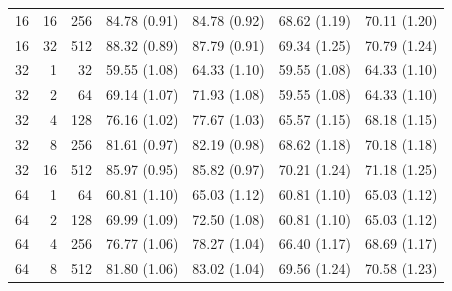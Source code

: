 \documentclass[11pt,letterpaper]{article}
\begin{document}
\begin{table}[p]
\begin{tabular}{@{}rrr rrrr@{}}
16 & 16 & 256 & 84.78 {\scriptsize (0.91)} & 84.78 {\scriptsize (0.92)} & 68.62 {\scriptsize (1.19)} & 70.11 {\scriptsize (1.20)} \\
16 & 32 & 512 & 88.32 {\scriptsize (0.89)} & 87.79 {\scriptsize (0.91)} & 69.34 {\scriptsize (1.25)} & 70.79 {\scriptsize (1.24)} \\
\midrule
32 & 1 & 32 & 59.55 {\scriptsize (1.08)} & 64.33 {\scriptsize (1.10)} & 59.55 {\scriptsize (1.08)} & 64.33 {\scriptsize (1.10)} \\
32 & 2 & 64 & 69.14 {\scriptsize (1.07)} & 71.93 {\scriptsize (1.08)} & 59.55 {\scriptsize (1.08)} & 64.33 {\scriptsize (1.10)} \\
32 & 4 & 128 & 76.16 {\scriptsize (1.02)} & 77.67 {\scriptsize (1.03)} & 65.57 {\scriptsize (1.15)} & 68.18 {\scriptsize (1.15)} \\
32 & 8 & 256 & 81.61 {\scriptsize (0.97)} & 82.19 {\scriptsize (0.98)} & 68.62 {\scriptsize (1.18)} & 70.18 {\scriptsize (1.18)} \\
32 & 16 & 512 & 85.97 {\scriptsize (0.95)} & 85.82 {\scriptsize (0.97)} & 70.21 {\scriptsize (1.24)} & 71.18 {\scriptsize (1.25)} \\
\midrule
64 & 1 & 64 & 60.81 {\scriptsize (1.10)} & 65.03 {\scriptsize (1.12)} & 60.81 {\scriptsize (1.10)} & 65.03 {\scriptsize (1.12)} \\
64 & 2 & 128 & 69.99 {\scriptsize (1.09)} & 72.50 {\scriptsize (1.08)} & 60.81 {\scriptsize (1.10)} & 65.03 {\scriptsize (1.12)} \\
64 & 4 & 256 & 76.77 {\scriptsize (1.06)} & 78.27 {\scriptsize (1.04)} & 66.40 {\scriptsize (1.17)} & 68.69 {\scriptsize (1.17)} \\
64 & 8 & 512 & 81.80 {\scriptsize (1.06)} & 83.02 {\scriptsize (1.04)} & 69.56 {\scriptsize (1.24)} & 70.58 {\scriptsize (1.23)} \\
\bottomrule
\end{tabular}
\end{table}
\end{document}
